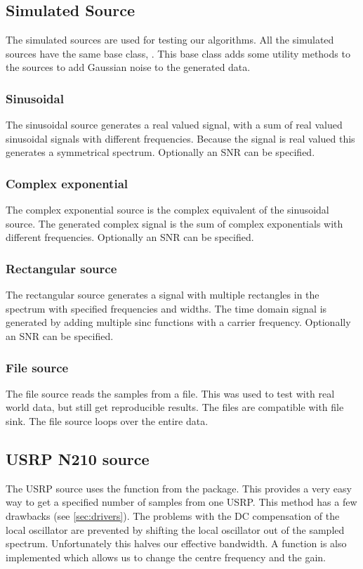 \documentclass[a4paper, openany, oneside]{memoir}
\begin{document}
\subsection{Simulated Source}
\label{sec:simulated-source}
The simulated sources are used for testing our algorithms. All the simulated sources have the same base class, . This base class adds some utility methods to the sources to add Gaussian noise to the generated data.

\subsubsection{Sinusoidal}
The sinusoidal source generates a real valued signal, with a sum of real valued sinusoidal signals with different frequencies. Because the signal is real valued this generates a symmetrical spectrum. Optionally an SNR can be specified.

\subsubsection{Complex exponential}
The complex exponential source is the complex equivalent of the sinusoidal source. The generated complex signal is the sum of complex exponentials with different frequencies. Optionally an SNR can be specified.

\subsubsection{Rectangular source}
The rectangular source generates a signal with multiple rectangles in the spectrum with specified frequencies and widths. The time domain signal is generated by adding multiple sinc functions with a carrier frequency. Optionally an SNR can be specified.

\subsubsection{File source}
The file source reads the samples from a file. This was used to test with real world data, but still get reproducible results. The files are compatible with  file sink. The file source loops over the entire data.

\subsection{USRP N210 source}
The USRP source uses the  function from the  package. This provides a very easy way to get a specified number of samples from one USRP. This method has a few drawbacks (see \cref{sec:drivers}). The problems with the DC compensation of the local oscillator are prevented by shifting the local oscillator out of the sampled spectrum. Unfortunately this halves our effective bandwidth. A function is also implemented which allows us to change the centre frequency and the gain.
\end{document}
